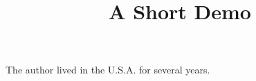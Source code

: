 \documentclass[article]{jss}
\title{A Short Demo}
\begin{document}
The author lived in the U.S.A. for several years.
\end{document}
